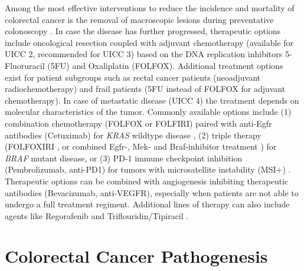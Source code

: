 \begin{flushleft}
Among the most effective interventions to reduce the incidence and mortality of colorectal cancer is the removal of macroscopic lesions during preventative colonoscopy \citep{nishiharaLongtermColorectalcancerIncidence2013}. In case the disease has further progressed, therapeutic options include oncological resection coupled with adjuvant chemotherapy (available for UICC 2, recommended for UICC 3) based on the DNA replication inhibitors 5-Fluoruracil (5FU) and Oxaliplatin (FOLFOX). Additional treatment options exist for patient subgroups such as rectal cancer patients (neoadjuvant radiochemotherapy) and frail patients (5FU instead of FOLFOX for adjuvant chemotherapy). In case of metastatic disease (UICC 4) the treatment depends on molecular characteristics of the tumor. Commonly available options include (1) combination chemotherapy (FOLFOX or FOLFIRI) paired with anti-Egfr antibodies (Cetuximab) for \textit{KRAS} wildtype disease \citep{vancutsemESMOConsensusGuidelines2016a}, (2) triple therapy (FOLFOXIRI \citep{vancutsemESMOConsensusGuidelines2016a}, or combined Egfr-, Mek- and Braf-inhibitor treatment \citep{kopetzEncorafenibBinimetinibCetuximab2019}) for \textit{BRAF} mutant disease, or (3) PD-1 immune checkpoint inhibition (Pembrolizumab, anti-PD1) for tumors with microsatellite instability (MSI+) \citep{andrePembrolizumabMicrosatelliteInstabilityHighAdvanced2020}. Therapeutic options can be combined with angiogenesis inhibiting therapeutic antibodies (Bevacizumab, anti-VEGFR), especially when patients are not able to undergo a full treatment regiment. Additional lines of therapy can also include agents like Regorafenib and Triflouridin/Tipiracil \citep{vancutsemESMOConsensusGuidelines2016a}. 
\par

\section{Colorectal Cancer Pathogenesis}


\end{flushleft}
